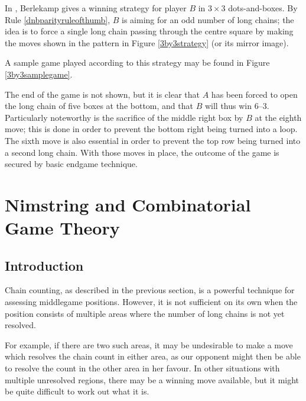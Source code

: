 \documentclass[a4paper,twocolumn]{article}
\begin{document}
In \cite{berl}, Berlekamp gives a winning strategy for player $B$ in
$3 \times 3$ dots-and-boxes. By Rule \ref{dnbparityruleofthumb}, $B$
is aiming for an odd number of long chains; the idea is to force a
single long chain passing through the centre square by making the
moves shown in the pattern in Figure \ref{3by3strategy} (or its mirror
image).

\begin{figure*}
  \centering
  \def\svgscale{0.7}
  
  \caption{Player $B$'s winning strategy in $3 \times 3$ dots-and-boxes}
  \label{3by3strategy}
\end{figure*}

A sample game played according to this strategy may be found in Figure
\ref{3by3samplegame}.

\begin{figure*}
  \centering
  \def\svgscale{0.5}
  
  \caption{Sample $3 \times 3$ game played according to Berlekamp's
    strategy}
  \label{3by3samplegame}
\end{figure*}

The end of the game is not shown, but it is clear that $A$ has been
forced to open the long chain of five boxes at the bottom, and that
$B$ will thus win 6--3. Particularly noteworthy is the sacrifice of
the middle right box by $B$ at the eighth move; this is done in order
to prevent the bottom right being turned into a loop. The sixth move
is also essential in order to prevent the top row being turned into a
second long chain. With those moves in place, the outcome of the game
is secured by basic endgame technique.

\section{Nimstring and Combinatorial Game Theory}

\subsection{Introduction}

Chain counting, as described in the previous section, is a powerful
technique for assessing middlegame positions. However, it is not
sufficient on its own when the position consists of multiple areas
where the number of long chains is not yet resolved.

For example, if there are two such areas, it may be undesirable to
make a move which resolves the chain count in either area, as our
opponent might then be able to resolve the count in the other area in
her favour. In other situations with multiple unresolved regions,
there may be a winning move available, but it might be quite difficult
to work out what it is.
\end{document}
